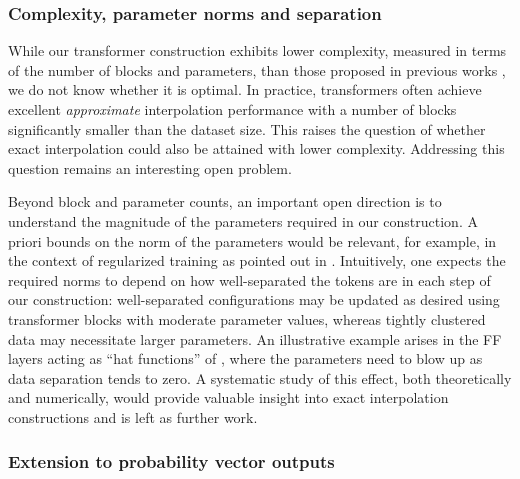 \documentclass[pdflatex,sn-mathphys-num]{sn-jnl}%
\theoremstyle{thmstyleone}%
\theoremstyle{thmstyletwo}%
\theoremstyle{thmstylethree}%
\numberwithin{equation}{section}
\begin{document}
\subsubsection{Complexity, parameter norms and separation}\label{sss:paramNorms}

While our transformer construction exhibits lower complexity, measured in terms of the number of blocks and parameters, than those proposed in previous works \cite{geshkovski2024measure}, we do not know whether it is optimal. In practice, transformers often achieve excellent \textit{approximate} interpolation performance with a number of blocks significantly smaller than the dataset size. This raises the question of whether exact interpolation could also be attained with lower complexity. Addressing this question remains an interesting open problem.

Beyond block and parameter counts, an important open direction is to understand the magnitude of the parameters required in our construction. A priori bounds on the norm of the parameters would be relevant, for example, in the context of regularized training as pointed out in . Intuitively, one expects the required norms to depend on how well-separated the tokens are in each step of our construction: well-separated configurations may be updated as desired using transformer blocks with moderate parameter values, whereas tightly clustered data may necessitate larger parameters. 
An illustrative example arises in the FF layers acting as ``hat functions'' of , where the parameters need to blow up as data separation tends to zero. A systematic study of this effect, both theoretically and numerically, would provide valuable insight into exact interpolation constructions and is left as further work.


\subsubsection{Extension to probability vector outputs}\label{sss:extensionProbVectorOutputs}
\end{document}
